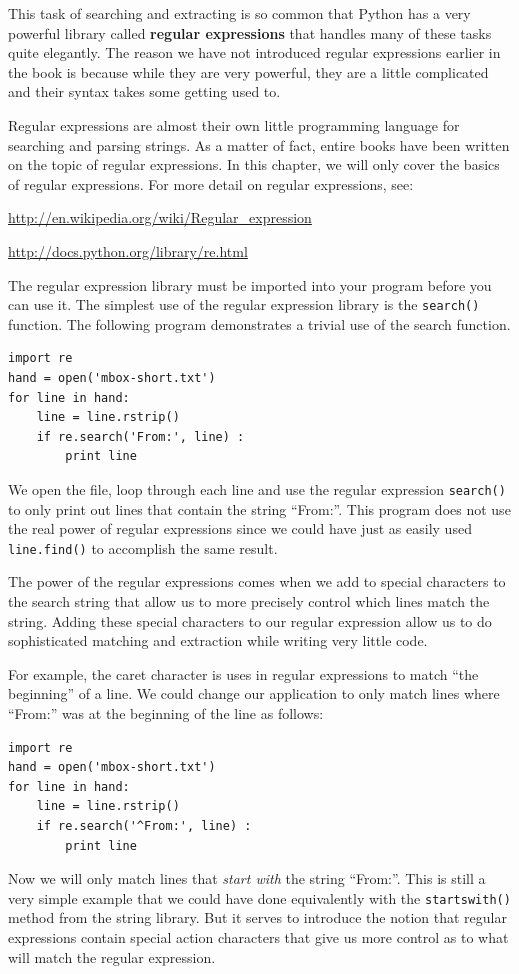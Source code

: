 \documentclass[10pt]{book}
\begin{document}
This task of searching and extracting is so common that Python has a very powerful library called {\bf regular expressions} that handles many of these tasks quite elegantly.  The reason we have not introduced regular expressions earlier in the book is because while they are very powerful, they are a little complicated and their syntax takes some getting used to. 

Regular expressions are almost their own little programming language for searching and parsing strings.  As a matter of fact, entire books have been written on the topic of regular expressions.  In this chapter, we will only cover the basics of regular expressions.  For more detail on regular expressions, see:

\url{http://en.wikipedia.org/wiki/Regular_expression}

\url{http://docs.python.org/library/re.html}

The regular expression library must be imported into your program before you can use it.  The simplest use of the regular expression library is the {\tt search()} function.  The following program demonstrates a trivial use of the search function.

\beforeverb
\begin{verbatim}
import re
hand = open('mbox-short.txt')
for line in hand:
    line = line.rstrip()
    if re.search('From:', line) :
        print line
\end{verbatim}
\afterverb
%
We open the file, loop through each line and use the regular expression {\tt search()} to only print out lines that contain the string ``From:''.   This program does not use the real power of regular expressions since we could have just as easily used {\tt line.find()} to accomplish the same result.

The power of the regular expressions comes when we add to special characters to the search string that allow us to more precisely control which lines match the string.  Adding these special characters to our regular expression allow us to do sophisticated matching and extraction while writing very little code.

For example, the caret character is uses in regular 
expressions to match ``the beginning'' of a line.
We could change our application to only match 
lines where ``From:'' was at the beginning of the line as follows:

\beforeverb
\begin{verbatim}
import re
hand = open('mbox-short.txt')
for line in hand:
    line = line.rstrip()
    if re.search('^From:', line) :
        print line
\end{verbatim}
\afterverb
%
Now we will only match lines that {\em start with} the string ``From:''.  This is still a very simple example that we could have done equivalently with the {\tt startswith()} method from the string library.  But it serves to introduce the notion that regular expressions contain special action characters that give us more control as to what will match the regular expression.
\end{document}
